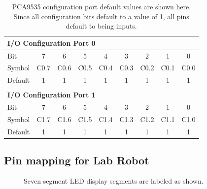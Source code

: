 \begin{table}[!htb]
	\centering
	\begin{tabular}{l c c c c c c c c}
        \multicolumn{5}{l}{\textbf{I/O Configuration Port 0}} \\
		\hline
		Bit & 7 & 6 & 5 & 4 & 3 & 2 & 1 & 0 \\
		\hline
        Symbol & C0.7 & C0.6 & C0.5 & C0.4 & C0.3 & C0.2 & C0.1 & C0.0\\
        Default & 1 & 1 & 1 & 1 & 1 & 1 & 1 & 1 \\
        \hline
        \\
        \multicolumn{5}{l}{\textbf{I/O Configuration Port 1}} \\
		\hline
		Bit & 7 & 6 & 5 & 4 & 3 & 2 & 1 & 0 \\
		\hline
        Symbol & C1.7 & C1.6 & C1.5 & C1.4 & C1.3 & C1.2 & C1.1 & C1.0\\
        Default & 1 & 1 & 1 & 1 & 1 & 1 & 1 & 1 \\
        \hline
	\end{tabular}
	\caption{PCA9535 configuration port default values are shown here. Since all 
    configuration bits default to a value of 1, all pins default to being inputs.}
	\label{table:pca9535config}
\end{table}

\subsection{Pin mapping for Lab Robot}

\begin{figure}[!htb]
	\centering
\caption{Seven segment LED display segments are labeled as shown.}
\label{fig:ledsegments}
\end{figure}


